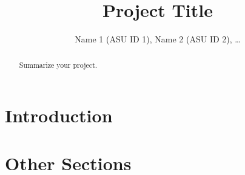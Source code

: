 \documentclass[twocolumn, 11pt]{article}
\title{Project Title}
\author{Name 1 (ASU ID 1), Name 2 (ASU ID 2), \dots}
\begin{document}
\maketitle

\begin{abstract}
    Summarize your project.
\end{abstract}

\section{Introduction}

\section{Other Sections}
\end{document}
